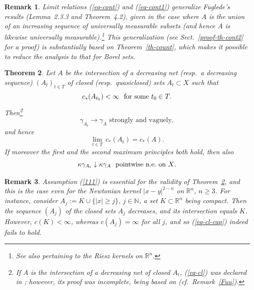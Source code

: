 \documentclass[12pt,a4paper,reqno]{amsart} %
\theoremstyle{lause}
\theoremstyle{maaritelma}
\theoremstyle{lause}
\newtheorem{theorem}{Theorem}[section]
\theoremstyle{maaritelma}
\newtheorem{remark}[theorem]{Remark}
\numberwithin{equation}{section}
\begin{document}
\begin{remark}Limit relations (\ref{eq-cont}) and (\ref{eq-cont1}) generalize Fuglede's results \cite{F1} (Lemma~2.3.3 and Theorem~4.2), given in the case where $A$ is the union of an increasing sequence of universally measurable subsets (and hence $A$ is likewise universally measurable).\footnote{See also \cite[Section~II.2.9, Remark]{L} pertaining to the Riesz kernels on $\mathbb R^n$.} This generalization (see Sect.~\ref{proof-th-cont2} for a proof) is substantially based on Theorem~\ref{th-count}, which makes it possible to reduce the analysis to that for Borel sets.
\end{remark}

\begin{theorem}\label{th-cont-bor2}Let\/ $A$ be the intersection of a decreasing net\/ {\rm(}resp.\ a decreasing sequence\/{\rm)} $(A_t)_{t\in T}$ of closed\/ {\rm(}resp.\ quasiclosed\/{\rm)} sets\/ $A_t\subset X$ such that
\begin{equation}\label{111}c_*(A_{t_0})<\infty\text{ \ for some\/ $t_0\in T$}.\end{equation}
Then\/\footnote{If $A$ is the intersection of a decreasing net of closed $A_t$, (\ref{eq-cl}) was declared in \cite[Lemma~4.2.1]{F1}; however, its proof was incomplete, being based on \cite[Section~2.5, Eq.~(1)]{F1} (cf.\ Remark~\ref{Fuu}).\label{f-decr}}
\begin{equation}\gamma_{A_t}\to\gamma_A\text{ \ strongly and vaguely},\label{eq-cl}\end{equation}
and hence
\begin{equation}\lim_{t\in T}\,c_*(A_t)=c_*(A).\label{eq-cl-cap}\end{equation}
If moreover the first and the second maximum principles both hold,
then also
\begin{equation}\label{eq-cl-pot}\kappa\gamma_{A_t}\downarrow\kappa\gamma_A\text{ \ pointwise n.e.\ on\/ $X$}.\end{equation}
\end{theorem}

\begin{remark}Assumption (\ref{111}) is essential for the validity of Theorem~\ref{th-cont-bor2}, and this is the case even for the Newtonian kernel $|x-y|^{2-n}$ on $\mathbb R^n$, $n\geqslant3$. For instance, consider $A_j:=K\cup\{|x|\geqslant j\}$, $j\in\mathbb N$, a set $K\subset\mathbb R^n$ being compact. Then the sequence $(A_j)$ of the closed sets $A_j$ decreases, and its intersection equals $K$. However, $c(K)<\infty$, whereas $c(A_j)=\infty$ for all $j$, and so (\ref{eq-cl-cap}) indeed fails to hold.\end{remark}
\end{document}
